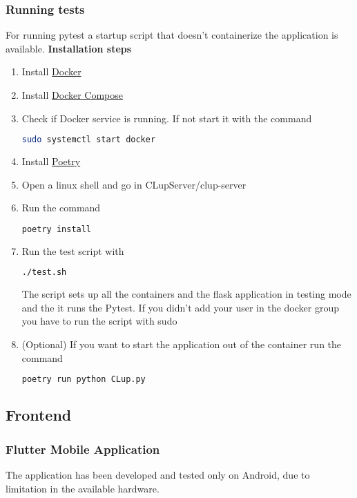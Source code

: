 \subsubsection{Running tests}
For running pytest a startup script that doesn't containerize the application is available.
\textbf{Installation steps}
\begin{enumerate}
    \item Install \href{https://docs.docker.com/get-docker/}{Docker}
    \item Install \href{https://docs.docker.com/compose/install/}{Docker Compose}
    \item Check if Docker service is running. If not start it with the command
    \begin{lstlisting}[language=bash]
    sudo systemctl start docker
    \end{lstlisting}
    \item Install \href{https://python-poetry.org/}{Poetry}
    \item Open a linux shell and go in CLupServer/clup-server 
    \item Run the command 
    \begin{lstlisting}[language=bash]
    poetry install
    \end{lstlisting}
    \item Run the test script with 
    \begin{lstlisting}[language=bash]
    ./test.sh
    \end{lstlisting}
    The script sets up all the containers and the flask application in testing mode and the it runs the Pytest.
    If you didn't add your user in the docker group 
    you have to run the script with sudo
    \item (Optional) If you want to start the application out of the container run the command
    \begin{lstlisting}[language=bash]
    poetry run python CLup.py
    \end{lstlisting}
\end{enumerate}

\subsection{Frontend}

\subsubsection{Flutter Mobile Application}
The application has been developed and tested only on Android, due to limitation in the available hardware.


